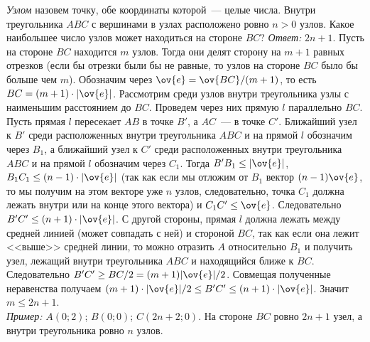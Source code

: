 \problem{}
\emph{Узлом} назовем точку, обе координаты которой~--- целые числа.
Внутри треугольника $ABC$ с вершинами в узлах расположено ровно $n > 0$ узлов.
Какое наибольшее число узлов может находиться на стороне $BC$?
\solution
\emph{Ответ:} $2 n + 1$.
Пусть на стороне $BC$ находится $m$ узлов.
Тогда они делят сторону на $m + 1$ равных отрезков
(если бы отрезки были бы не равные, то узлов на стороне $BC$ было бы больше чем
$m$).
Обозначим через $\ov{e} = \ov{BC} / (m + 1)$, то есть
$BC = (m + 1) \cdot |\ov{e}|$.
Рассмотрим среди узлов внутри треугольника узлы с наименьшим расстоянием до
$BC$.
Проведем через них прямую $l$ параллельно $BC$.
Пусть прямая $l$ пересекает $AB$ в точке $B'$, а $AC$~--- в точке $C'$.
Ближайший узел к $B'$ среди расположенных внутри треугольника $ABC$ и на прямой
$l$ обозначим через $B_1$, а ближайший узел к $C'$ среди расположенных внутри
треугольника $ABC$ и на прямой $l$ обозначим через $C_1$.
Тогда $B' B_1 \leq |\ov{e}|$, $B_1 C_1 \leq (n - 1) \cdot |\ov{e}|$
(так как если мы отложим от $B_1$ вектор $(n - 1) \ov{e}$, то мы получим на
этом векторе уже $n$ узлов, следовательно, точка $C_1$ должна лежать внутри или
на конце этого вектора)
и $C_1 C' \leq \ov{e}$.
Следовательно $B' C' \leq (n + 1) \cdot |\ov{e}|$.
С другой стороны, прямая $l$ должна лежать между средней линией
(может совпадать с ней) и стороной $BC$, так как если она лежит
<<выше>> средней линии, то можно отразить $A$ относительно $B_1$ и получить
узел, лежащий внутри треугольника $ABC$ и находящийся ближе к $BC$.
Следовательно $B' C' \geq BC / 2 = (m + 1) |\ov{e}| / 2$.
Совмещая полученные неравенства получаем
$(m + 1) \cdot |\ov{e}| / 2 \leq B' C' \leq (n + 1) \cdot |\ov{e}|$.
Значит $m \leq 2 n + 1$.
\\
\emph{Пример:} $A(0; 2)$; $B(0; 0)$; $C(2 n + 2; 0)$.
На стороне $BC$ ровно $2 n + 1$ узел, а внутри треугольника ровно $n$ узлов.
\endproblem
